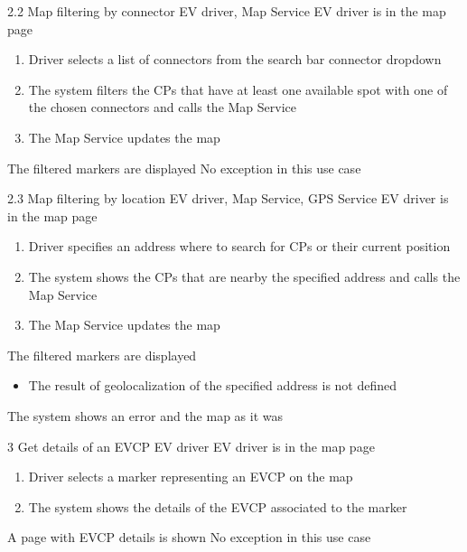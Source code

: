 \usecase
{2.2}
{Map filtering by connector}
{EV driver, Map Service}
{EV driver is in the map page}
{
    \begin{enumerate}
        \item Driver selects a list of connectors from the search bar connector dropdown
        \item The system filters the CPs that have at least one available spot with one of the chosen connectors and calls the Map Service
        \item The Map Service updates the map
    \end{enumerate}
}
{The filtered markers are displayed}
{
    No exception in this use case
}
{
}

\usecase
{2.3}
{Map filtering by location}
{EV driver, Map Service, GPS Service}
{EV driver is in the map page}
{
    \begin{enumerate}
        \item Driver specifies an address where to search for CPs or their current position
        \item The system shows the CPs that are nearby the specified address and calls the Map Service
        \item The Map Service updates the map
    \end{enumerate}
}
{The filtered markers are displayed}
{
    \begin{itemize}
        \item The result of geolocalization of the specified address is not defined
    \end{itemize}
}
{
    The system shows an error and the map as it was
}

\usecase
{3}
{Get details of an EVCP}
{EV driver}
{EV driver is in the map page}
{
    \begin{enumerate}
        \item Driver selects a marker representing an EVCP on the map
        \item The system shows the details of the EVCP associated to the marker
    \end{enumerate}
}
{A page with EVCP details is shown}
{
    No exception in this use case
}
{
}

